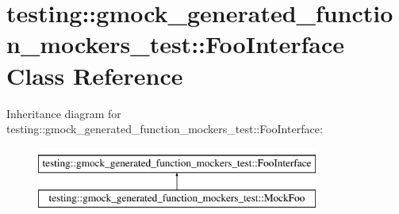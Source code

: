 \hypertarget{classtesting_1_1gmock__generated__function__mockers__test_1_1FooInterface}{}\section{testing\+::gmock\+\_\+generated\+\_\+function\+\_\+mockers\+\_\+test\+::Foo\+Interface Class Reference}
\label{classtesting_1_1gmock__generated__function__mockers__test_1_1FooInterface}
Inheritance diagram for testing\+::gmock\+\_\+generated\+\_\+function\+\_\+mockers\+\_\+test\+::Foo\+Interface\+:\begin{figure}[H]
\begin{center}
\leavevmode
\includegraphics[height=2.000000cm]{classtesting_1_1gmock__generated__function__mockers__test_1_1FooInterface}
\end{center}
\end{figure}
